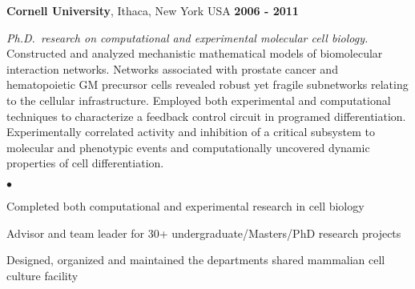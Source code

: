 \documentclass[margin,line]{res}
\newenvironment{list2}{
  \begin{list}{$\bullet$}{%
      \setlength{\itemsep}{0in}
      \setlength{\parsep}{0in} \setlength{\parskip}{0in}
      \setlength{\topsep}{0in} \setlength{\partopsep}{0in} 
      \setlength{\leftmargin}{0.2in}}}{\end{list}}
\begin{document}
\begin{resume}
{\bf Cornell University}, Ithaca, New York USA \hfill {\bf 2006 - 2011}

{\em Ph.D.~research on computational and experimental molecular cell biology.}\\   
Constructed and analyzed mechanistic mathematical models of biomolecular interaction networks.
Networks associated with prostate cancer and hematopoietic GM precursor cells revealed 
robust yet fragile subnetworks relating to the cellular infrastructure.
Employed both experimental and computational techniques to characterize a feedback control circuit
in programed differentiation.
Experimentally correlated activity and inhibition of a critical 
subsystem to molecular and phenotypic events and 
computationally uncovered dynamic properties of cell differentiation. 
%
%
% 
\begin{list2}
\item Completed both computational and experimental research in cell biology
\item Advisor and team leader for 30+ undergraduate/Masters/PhD research projects
\item Designed, organized and maintained the departments shared mammalian cell culture facility
\end{list2}

%


\end{resume}
\end{document}
